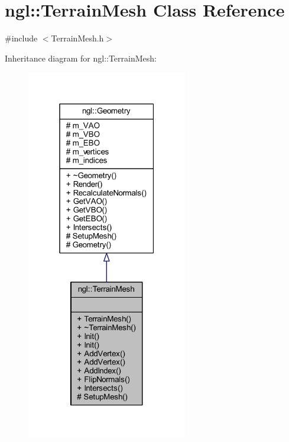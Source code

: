 \hypertarget{classngl_1_1_terrain_mesh}{}\section{ngl\+:\+:Terrain\+Mesh Class Reference}
\label{classngl_1_1_terrain_mesh}


{\ttfamily \#include $<$Terrain\+Mesh.\+h$>$}



Inheritance diagram for ngl\+:\+:Terrain\+Mesh\+:
\nopagebreak
\begin{figure}[H]
\begin{center}
\leavevmode
\includegraphics[width=199pt]{classngl_1_1_terrain_mesh__inherit__graph}
\end{center}
\end{figure}


